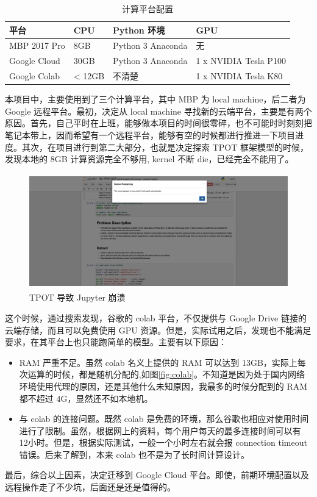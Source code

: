 \documentclass[a4paper]{article}
\begin{document}
\begin{table}[htp]
\caption{计算平台配置}\label{tab:platform}
\begin{center}
	\begin{tabular}{|l|l|l|p{6cm}|}
	\hline
	\textbf{平台} & \textbf{CPU} & \textbf{Python 环境} & \textbf{GPU}\\ \hline \hline
	MBP 2017 Pro			& 8GB 	& Python 3 Anaconda	& 无\\ \hline
	Google Cloud  	& 30GB	&  Python 3 Anaconda	& 1 x NVIDIA Tesla P100
\\ \hline
	Google Colab	&  < 12GB & 不清楚 & 1 x NVIDIA Tesla K80 \\ \hline
	\hline
	\end{tabular}
\end{center}
\end{table}

本项目中，主要使用到了三个计算平台，其中 MBP 为 local machine，后二者为 Google 远程平台。最初，决定从 local machine 寻找新的云端平台，主要是有两个原因。首先，自己平时在上班，能够做本项目的时间很零碎，也不可能时时刻刻把笔记本带上，因而希望有一个远程平台，能够有空的时候都进行推进一下项目进度。其次，在项目进行到第二大部分，也就是决定探索 TPOT 框架模型的时候，发现本地的 8GB 计算资源完全不够用, kernel 不断 die，已经完全不能用了。

\begin{figure}[ht]
 \centering
 \includegraphics[height=5cm]{images/TPOT-kernel-die.png}
 \caption{TPOT 导致 Jupyter 崩溃}
 \label{fig:kernel-die}
\end{figure}

这个时候，通过搜索发现，谷歌的 colab 平台，不仅提供与 Google Drive 链接的云端存储，而且可以免费使用 GPU 资源。但是，实际试用之后，发现也不能满足要求，在其平台上也只能跑简单的模型。主要有以下原因：
\begin{itemize}


\item  RAM 严重不足。虽然 colab 名义上提供的 RAM 可以达到 13GB，实际上每次运算的时候，都是随机分配的,如图\ref{fig:colab}。不知道是因为处于国内网络环境使用代理的原因，还是其他什么未知原因，我最多的时候分配到的 RAM 都不超过 4G，显然还不如本地机。
\item 与 colab 的连接问题。既然 colab 是免费的环境，那么谷歌也相应对使用时间进行了限制。虽然，根据网上的资料，每个用户每天的最多连接时间可以有 12小时。但是，根据实际测试，一般一个小时左右就会报 connection timeout 错误。后来了解到，本来 colab 也不是为了长时间计算设计。

\end{itemize}
最后，综合以上因素，决定迁移到 Google Cloud 平台。即使，前期环境配置以及远程操作走了不少坑，后面还是还是值得的。
\end{document}
